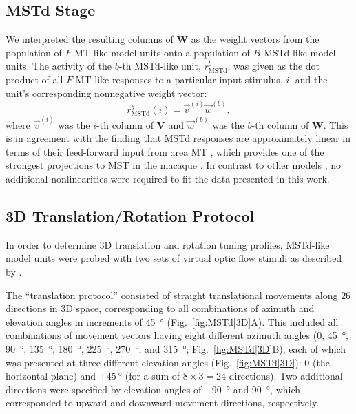 \subsection{MSTd Stage}
\label{sec:MSTd|methods|MSTd}
We interpreted the resulting columns of \textbf{W} as the weight vectors 
from the population of $F$ \ac{MT}-like model units onto a population of $B$
\ac{MSTd}-like model units. The activity of the $b$-th \ac{MSTd}-like unit,
$r_{\textrm{MSTd}}^b$, was given as the dot product of all $F$ \ac{MT}-like
responses to a particular input stimulus, $i$, and the unit's corresponding
nonnegative weight vector:
\begin{equation}
r_{\textrm{MSTd}}^b (i) = \vec{v}^{(i)} \vec{w}^{(b)},
\label{sec:MSTd|methods|rMSTd}
\end{equation}
where $\vec{v}^{(i)}$ was the $i$-th column of \textbf{V} and
$\vec{w}^{(b)}$ was the $b$-th column of \textbf{W}. This is in agreement 
with the finding that \ac{MSTd} responses are approximately linear in terms 
of their feed-forward input from area \ac{MT} \citep{Tanaka1989,DuffyWurtz1991b},
which provides one of the strongest projections to \ac{MST} in the macaque
\citep{Boussaoud1990}. In contrast to other models 
\citep{Lappe1996,ZemelSejnowski1998,Grossberg1999,Mineault2012},
no additional nonlinearities were required to fit the data presented 
in this work.


\subsection{3D Translation/Rotation Protocol}
\label{sec:MSTd|methods|3D}
In order to determine 3D translation and rotation tuning profiles, 
\ac{MSTd}-like model units were probed with two sets of virtual optic flow 
stimuli as described by \cite{Takahashi2007}.

The ``translation protocol'' consisted of straight translational movements 
along $26$ directions in 3D space, corresponding to all combinations of 
azimuth and elevation angles in increments of \SI{45}{\degree} 
(Fig.~\ref{fig:MSTd|3D}A). This included all combinations of movement 
vectors having eight different azimuth angles 
($0$, \SI{45}{\degree}, \SI{90}{\degree}, \SI{135}{\degree}, 
\SI{180}{\degree}, \SI{225}{\degree}, \SI{270}{\degree}, and \SI{315}{\degree};
Fig.~\ref{fig:MSTd|3D}B), each of which was presented at three different
elevation angles (Fig.~\ref{fig:MSTd|3D}): $0$ (the horizontal plane) and
$\pm \SI{45}{\degree}$ (for a sum of $8 \times 3 = 24$ directions).
Two additional directions were specified by elevation angles of \SI{-90}{\degree}
and \SI{+90}{\degree}, which corresponded to upward and downward movement
directions, respectively.

